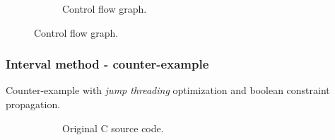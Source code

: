 \documentclass[aspectratio=1610]{beamer}
\begin{document}
\begin{frame}[noframenumbering]
\begin{figure}[htbp]
\begin{subfigure}[b]{0.50\textwidth}
			\caption{Control flow graph.}
		\end{subfigure}
	\end{figure}
\end{frame}

\begin{frame}[noframenumbering]
	\frametitle{Interval method - counter-example}
	Counter-example with \textit{jump threading} optimization and boolean constraint propagation.
	\begin{figure}[htbp]
		\centering
		\begin{subfigure}[b]{0.30\textwidth}
			\centering
			
			\caption{Original C source code.}
		\end{subfigure}
		\begin{subfigure}[b]{0.50\textwidth}
			\centering

\end{subfigure}
\end{figure}
\end{frame}
\end{document}
